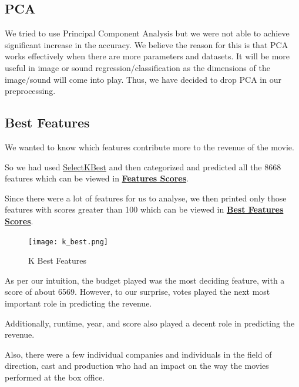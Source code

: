 \documentclass[conference]{IEEEtran}
\begin{document}
        \subsection*{PCA}
            We tried to use Principal Component Analysis but we were not able to achieve significant increase in the accuracy.
            We believe the reason for this is that PCA works effectively when there are more parameters and datasets.
            It will be more useful in image or sound regression/classification as the dimensions of the image/sound will come into play.
            Thus, we have decided to drop PCA in our preprocessing.
            
        \subsection*{Best Features}
            We wanted to know which features contribute more to the revenue of the movie.
            
            So we had used \href{https://scikit-learn.org/stable/modules/generated/sklearn.feature_selection.SelectKBest.html}{SelectKBest} and then categorized and predicted all the 8668 features which can be viewed in \href{https://github.com/Vikranth3140/Movie-Revenue-Prediction/blob/main/Helper%20files/Best%20Festures/feature_scores.txt}{\textbf{Features Scores}}.
            
            Since there were a lot of features for us to analyse, we then printed only those features with scores greater than 100 which can be viewed in \href{https://github.com/Vikranth3140/Movie-Revenue-Prediction/blob/main/Helper%20files/Best%20Festures/significant_features.txt}{\textbf{Best Features Scores}}.
            
            \begin{figure}[H]
                \centering
                \texttt{[image: k\_best.png]}
                \caption{K Best Features}
                \label{fig:k-best}
            \end{figure}
            
            As per our intuition, the budget played was the most deciding feature, with a score of about 6569.
            However, to our surprise, votes played the next most important role in predicting the revenue.
            
            Additionally, runtime, year, and score also played a decent role in predicting the revenue.
            
            Also, there were a few individual companies and individuals in the field of direction, cast and production who had an impact on the way the movies performed at the box office.
            
\end{document}
